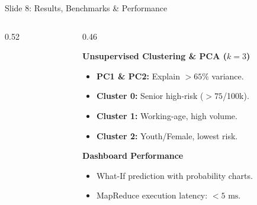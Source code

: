 \documentclass[10pt, aspectratio=169]{beamer}
\begin{document}
\begin{frame}{Slide 8: Results, Benchmarks \& Performance}
\begin{columns}[T]
\begin{column}{0.52\textwidth}
        \end{column}
        \begin{column}{0.46\textwidth}
            \begin{block}{\textbf{Unsupervised Clustering \& PCA ($k=3$)}}
                \begin{itemize}\setlength{\itemsep}{2pt}
                    \item \textbf{PC1 \& PC2:} Explain $>65\%$ variance.
                    \item \textbf{Cluster 0:} Senior high-risk ($>75$/100k).
                    \item \textbf{Cluster 1:} Working-age, high volume.
                    \item \textbf{Cluster 2:} Youth/Female, lowest risk.
                \end{itemize}
            \end{block}
            \vspace{0.15cm}
            \begin{block}{\textbf{Dashboard Performance}}
                \begin{itemize}\setlength{\itemsep}{2pt}
                    \item What-If prediction with probability charts.
                    \item MapReduce execution latency: $<5\text{ ms}$.
                \end{itemize}
            \end{block}
        \end{column}
    \end{columns}
\end{frame}
\end{document}
